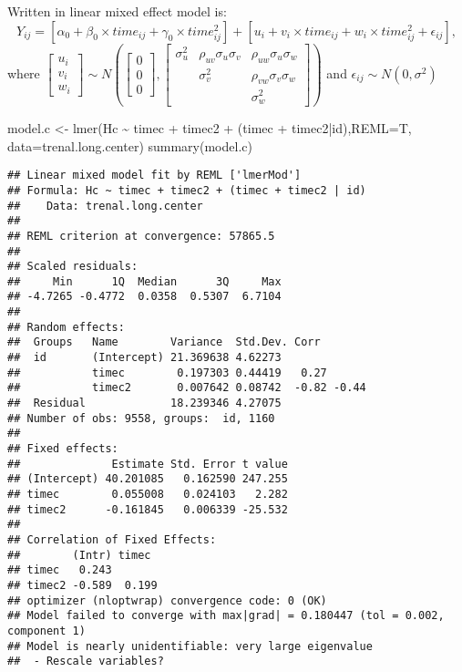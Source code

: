 \documentclass[
]{article}
\newenvironment{Shaded}{\begin{snugshade}}{\end{snugshade}}
\newcommand{\AttributeTok}[1]{\textcolor[rgb]{0.77,0.63,0.00}{#1}}
\newcommand{\FunctionTok}[1]{\textcolor[rgb]{0.00,0.00,0.00}{#1}}
\newcommand{\NormalTok}[1]{#1}
\newcommand{\OtherTok}[1]{\textcolor[rgb]{0.56,0.35,0.01}{#1}}
\newcommand{\SpecialCharTok}[1]{\textcolor[rgb]{0.00,0.00,0.00}{#1}}
\begin{document}
Written in linear mixed effect model is:
\[Y_{ij} = [\alpha_0 + \beta_0 \times time_{ij} + \gamma_0 \times time_{ij}^2] + [ u_i + v_i \times time_{ij} + w_i \times time_{ij}^2 +  \epsilon_{ij} ],\]
where
\(\begin{bmatrix} u_i \\ v_i \\w_i \end{bmatrix} \sim N\left(\begin{bmatrix} 0 \\ 0 \\0 \end{bmatrix}, \begin{bmatrix}\sigma_{u}^2 & \rho_{uv}\sigma_u\sigma_v & \rho_{uw} \sigma_u \sigma_w \\ & \sigma_v^2 & \rho_{vw} \sigma_v\sigma_w \\ & & \sigma_w^2 \end{bmatrix}\right)\)
and \(\epsilon_{ij} \sim N(0,\sigma^2)\)

\begin{Shaded}
\begin{Highlighting}[]
\NormalTok{model.c }\OtherTok{\textless{}{-}} \FunctionTok{lmer}\NormalTok{(Hc }\SpecialCharTok{\textasciitilde{}}\NormalTok{ timec }\SpecialCharTok{+}\NormalTok{ timec2 }\SpecialCharTok{+}\NormalTok{ (timec }\SpecialCharTok{+}\NormalTok{ timec2}\SpecialCharTok{|}\NormalTok{id),}\AttributeTok{REML=}\NormalTok{T, }\AttributeTok{data=}\NormalTok{trenal.long.center)}
\FunctionTok{summary}\NormalTok{(model.c)}
\end{Highlighting}
\end{Shaded}

\begin{verbatim}
## Linear mixed model fit by REML ['lmerMod']
## Formula: Hc ~ timec + timec2 + (timec + timec2 | id)
##    Data: trenal.long.center
## 
## REML criterion at convergence: 57865.5
## 
## Scaled residuals: 
##     Min      1Q  Median      3Q     Max 
## -4.7265 -0.4772  0.0358  0.5307  6.7104 
## 
## Random effects:
##  Groups   Name        Variance  Std.Dev. Corr       
##  id       (Intercept) 21.369638 4.62273             
##           timec        0.197303 0.44419   0.27      
##           timec2       0.007642 0.08742  -0.82 -0.44
##  Residual             18.239346 4.27075             
## Number of obs: 9558, groups:  id, 1160
## 
## Fixed effects:
##              Estimate Std. Error t value
## (Intercept) 40.201085   0.162590 247.255
## timec        0.055008   0.024103   2.282
## timec2      -0.161845   0.006339 -25.532
## 
## Correlation of Fixed Effects:
##        (Intr) timec 
## timec   0.243       
## timec2 -0.589  0.199
## optimizer (nloptwrap) convergence code: 0 (OK)
## Model failed to converge with max|grad| = 0.180447 (tol = 0.002, component 1)
## Model is nearly unidentifiable: very large eigenvalue
##  - Rescale variables?
\end{verbatim}
\end{document}
